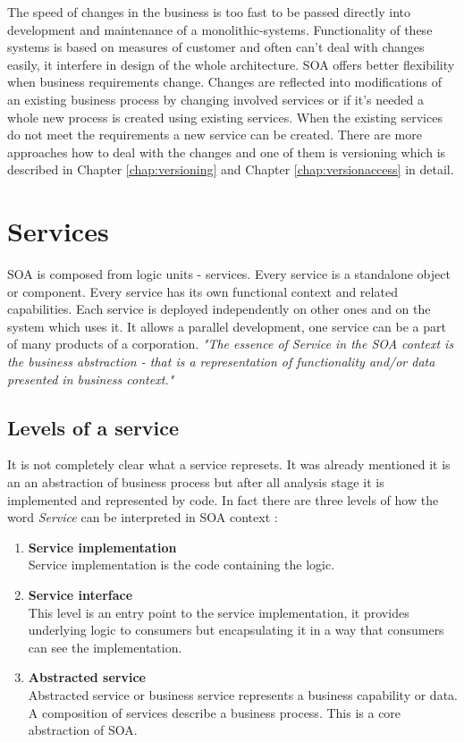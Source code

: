 The speed of changes in the business is too fast to be passed directly into development and maintenance of a \gls{monolithic-systems}. Functionality of these systems is based on measures of customer and often can't deal with changes easily, it interfere in design of the whole architecture. SOA offers better flexibility when business requirements change. Changes are reflected into modifications of an existing business process by changing involved services or if it's needed a whole new process is created using existing services. When the existing services do not meet the requirements a new service can be created. There are more approaches how to deal with the changes and one of them is versioning which is described in Chapter \ref{chap:versioning} and Chapter \ref{chap:versionaccess} in detail.

\section{Services}
\label{sec:services}
SOA is composed from logic units - services. Every service is a standalone object or component. Every service has its own functional context and related capabilities. Each service is deployed independently on other ones and on the system which uses it. It allows a parallel development, one service can be a part of many products of a corporation.
\textit{"The essence of Service in the SOA context is the business abstraction - that is a representation of functionality and/or data presented in business context."} \cite{agile-architecture}

\subsection{Levels of a service} 
\label{subsec:levels-of-service}

It is not completely clear what a service represets. It was already mentioned it is an an abstraction of business process but after all analysis stage it is implemented and represented by code.
In fact there are three levels of how the word \emph{Service} can be interpreted in SOA context \cite{agile-architecture}:
\begin{enumerate}
  \item \textbf{Service implementation} \hfill \\
Service implementation is the code containing the logic.
  \item \textbf{Service interface} \hfill \\ 
This level is an entry point to the service implementation, it provides underlying logic to consumers but encapsulating it in a way that consumers can see the implementation. 
  \item \textbf{Abstracted service} \hfill \\
Abstracted service or business service represents a business capability or data. A composition of services describe a business process. This is a core abstraction of SOA.
\end{enumerate}


